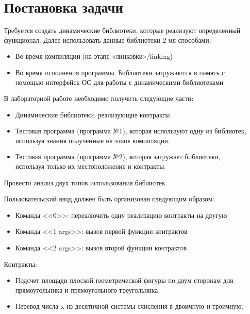 \documentclass[pdf, unicode, 12pt, a4paper,oneside,fleqn]{article}
\begin{document}
\section{Постановка задачи}

Требуется создать динамические библиотеки, которые реализуют определенный функционал. 
Далее использовать данные библиотеки 2-мя способами:

\begin{itemize}
    \item Во время компиляции (на этапе «линковки»/linking)
    \item Во время исполнения программы. Библиотеки загружаются в память с помощью 
            интерфейса ОС для работы с динамическими библиотеками
\end{itemize}

В лабораторной работе необходимо получить следующие части:

\begin{itemize}
    \item Динамические библиотеки, реализующие контракты
    \item Тестовая программа (программа №1), которая используют одну из библиотек, используя 
    знания полученные на этапе компиляции.
    \item Тестовая программа (программа №2), которая загружает библиотеки, используя только их 
    местоположение и контракты.
\end{itemize}

Провести анализ двух типов использования библиотек.

Пользовательский ввод должен быть организован следующим образом:

\begin{itemize}
    \item Команда <<0>>: переключить одну реализацию контракты на другую
    \item Команда <<1 args>>: вызов первой функции контрактов
    \item Команда <<2 args>>: вызов второй функции контрактов
\end{itemize}

Контракты:
\begin{itemize}
    \item Подсчет площади плоской геометрической фигуры по двум сторонам для прямоугольника и прямоугольного треугольника
    \item Перевод числа x из десятичной системы счисления в двоичную и троичную.
\end{itemize}
\end{document}
